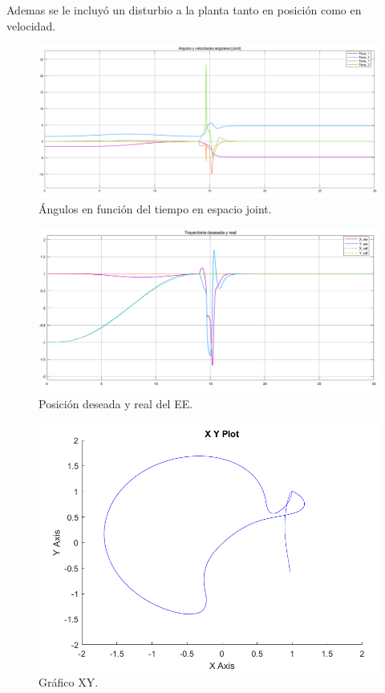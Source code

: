 Ademas se le incluy\'o un disturbio a la planta tanto en posici\'on como en velocidad.
\begin{figure}[H]
	\centering
	\includegraphics[width=0.8\linewidth]{ImagenesControl de posición no lineal/1_3_e_a}
	\caption{\'Angulos en funci\'on del tiempo en espacio joint.}	
	\label{fig:athetasd}
\end{figure}

\begin{figure}[H]
	\centering
	\includegraphics[width=0.8\linewidth]{ImagenesControl de posición no lineal/1_3_e_b}
	\caption{Posici\'on deseada y real del EE.}	
	\label{fig:aposd}
\end{figure}
\begin{figure}[H]
	\centering
	\includegraphics[width=0.5\linewidth]{ImagenesControl de posición no lineal/1_3_e_c}
	\caption{Gr\'afico XY.}	
	\label{fig:axyd}
\end{figure}

%
